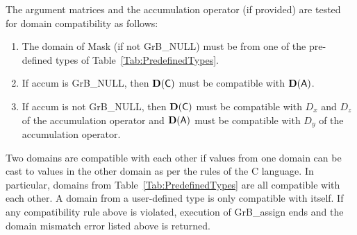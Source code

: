 The argument matrices and the accumulation 
operator (if provided) are tested for domain compatibility as follows:
\begin{enumerate}
	\item The domain of {\sf Mask} (if not {\sf GrB\_NULL}) must be from one of 
    the pre-defined types of Table~\ref{Tab:PredefinedTypes}.

	\item If {\sf accum} is {\sf GrB\_NULL}, then $\bold{D}({\sf C})$ must be 
    compatible with $\bold{D}({\sf A})$.

	\item If {\sf accum} is not {\sf GrB\_NULL}, then $\bold{D}({\sf C})$ must be
    compatible with $D_x$ and $D_z$ of the accumulation operator and 
    $\bold{D}({\sf A})$ must be compatible with $D_y$ of the accumulation operator.
\end{enumerate}
Two domains are compatible with each other if values from one domain can be cast 
to values in the other domain as per the rules of the C language.
In particular, domains from Table~\ref{Tab:PredefinedTypes} are all compatible 
with each other. A domain from a user-defined type is only compatible with itself.
If any compatibility rule above is violated, execution of {\sf GrB\_assign} ends
and the domain mismatch error listed above is returned.

